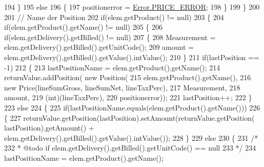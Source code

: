 \begin{DoxyCode}
194                     \}
195                     \textcolor{keywordflow}{else}
196                     \{
197                         positionerror = \hyperlink{enum_reduced_invoice_1_1_a_invoice_1_1_error_a5c521b3b1cc9827b5dba56d42a770481}{Error.PRICE\_ERROR};
198                     \}
199                 \}
200                 
201                 \textcolor{comment}{// Name der Position}
202                 \textcolor{keywordflow}{if}(elem.getProduct() != null)
203                 \{
204                     \textcolor{keywordflow}{if}(elem.getProduct().getName() != null)
205                     \{
206                         \textcolor{keywordflow}{if}(elem.getDelivery().getBilled() != null)
207                         \{
208                             Measurement = elem.getDelivery().getBilled().getUnitCode();
209                             amount = elem.getDelivery().getBilled().getValue().intValue();
210                         \}
211                         \textcolor{keywordflow}{if}(lastPosition == -1)
212                         \{
213                             lastPositionName = elem.getProduct().getName();
214                             returnValue.addPosition( \textcolor{keyword}{new} Position(
215                                     elem.getProduct().getName(),
216                                     \textcolor{keyword}{new} Price(lineSumGross, lineSumNet, lineTaxPerc),
217                                     Measurement,
218                                     amount,
219                                     (int)(lineTaxPerc),
220                                     positionerror));
221                             lastPosition++;
222                         \}
223                         \textcolor{keywordflow}{else}
224                         \{
225                             \textcolor{keywordflow}{if}(lastPositionName.equals(elem.getProduct().getName()))
226                             \{
227                                 returnValue.getPosition(lastPosition).setAmount(returnValue.getPosition(
      lastPosition).getAmount() + elem.getDelivery().getBilled().getValue().intValue());
228                             \}
229                             \textcolor{keywordflow}{else}
230                             \{
231                                 \textcolor{comment}{/* }
232 \textcolor{comment}{                                 * @todo if elem.getDelivery().getBilled().getUnitCode() == null}
233 \textcolor{comment}{                                 */}
234                                 lastPositionName = elem.getProduct().getName();

\end{DoxyCode}
